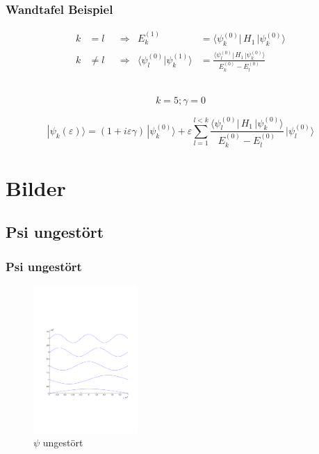 \documentclass[aspectratio=169]{beamer}
\begin{document}
\begin{frame}
  \frametitle{ Wandtafel Beispiel }
  
  \[
      \begin{aligned}
      k&=l
      &&\Rightarrow&
      E_k^{(1)}
      &=
      \langle \psi_k^{(0)}|\, H_1 \,|\psi_k^{(0)}\rangle
      \\
      k&\ne l
      &&\Rightarrow&
      \langle\psi_l^{(0)}|\psi_k^{(1)}\rangle
      &=
      \frac{\langle \psi_l^{(0)}|\, H_1 \,|\psi_k^{(0)}\rangle}{E_k^{(0)}-E_l^{(0)}}
    \end{aligned}
  \]
  
  \\
  
  \[
    k = 5 ; \gamma = 0
  \]
  
  \[
    |\psi_k(\varepsilon)\rangle
    =
    (1+i\varepsilon \gamma)
    \,|\psi_k^{(0)}\rangle
    +
    \varepsilon
    \sum_{l=1}^{ l < k }
    \frac{\langle \psi_l^{(0)}|\, H_1 \,|\psi_k^{(0)}\rangle}{E_k^{(0)}-E_l^{(0)}}
    \,
    |\psi_l^{(0)}\rangle
  \]
  
\end{frame}



\section{ Bilder }
\subsection{ Psi ungest\"ort }
\begin{frame}
  \frametitle{ Psi ungest\"ort }
  \begin{figure}
    \centering
    \includegraphics[height=5.6cm,clip=true,trim=2cm 7cm 1cm 8cm]{../../skript/efeld/Psi_ungestoert.pdf}
    \caption{$\psi$ ungest\"ort}
    \label{abb:efeld_psi_ungestoert}
  \end{figure}

\end{frame}
\end{document}

